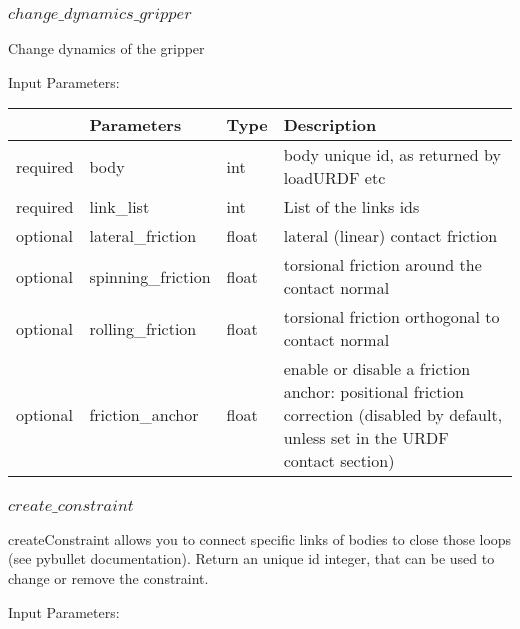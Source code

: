 \documentclass[
	ngerman,
	accentcolor=9c,%
	type=intern,
	marginpar=false
	]{tudapub}
\begin{document}
\subsubsection{$change\_dynamics\_gripper$}
\noindent Change dynamics of the gripper


\vspace{0.5cm}
\noindent Input Parameters:
\vspace{0.5cm}

\begin{tabular}{|p{}|p{}|p{}| p{}|}
\hline
 & \textbf{Parameters} & \textbf{Type} & \textbf{Description} \\
\hline
required & body & int  & body unique id, as returned by loadURDF etc\\
\hline
required & link\_list & int  & List of the links ids \\
\hline
optional & lateral\_friction & float  &  lateral (linear) contact friction \\
\hline
optional & spinning\_friction & float  & torsional friction around the contact normal\\
\hline
optional & rolling\_friction & float  & torsional friction orthogonal to contact normal\\
\hline
optional & friction\_anchor & float &  enable or disable a friction anchor: positional friction correction (disabled by default, unless set in
            the URDF contact section)\\
\hline
\end{tabular}
\vspace{0.5cm}




\subsubsection{$create\_constraint$}
\noindent createConstraint allows you to connect specific links of bodies to close those loops (see pybullet documentation). Return an unique id integer, that can be used to change or remove the constraint.



\vspace{0.5cm}
\noindent Input Parameters:
\vspace{0.5cm}
\end{document}
